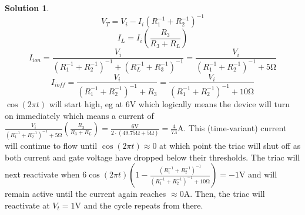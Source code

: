 \documentclass[10pt]{article}
\theoremstyle{definition}
\newtheorem{soln}{Solution}
\begin{document}
\begin{soln} 
  $$V_T=V_i-I_i\left(R_1^{-1}+R_2^{-1}\right)^{-1}$$
  $$I_L=I_i\left(\frac{R_3}{R_3+R_L}\right)$$
  $$I_{ion}=\frac{V_i}{\left(R_1^{-1}+R_2^{-1}\right)^{-1}+\left(R_L^{-1}+R_3^{-1}\right)^{-1}}=\frac{V_i}{\left(R_1^{-1}+R_2^{-1}\right)^{-1}+5\unit{\ohm}}$$
  $$I_{ioff}=\frac{V_i}{\left(R_1^{-1}+R_2^{-1}\right)^{-1}+R_3}=\frac{V_i}{\left(R_1^{-1}+R_2^{-1}\right)^{-1}+10\unit{\ohm}}$$
  $\cos(2\pi t)$ will start high, eg at $6\unit{\volt}$ which logically means the device will turn on immediately
  which means a current of $\frac{V_i}{\left(R_1^{-1}+R_2^{-1}\right)^{-1}+5\unit{\ohm}}\left(\frac{R_3}{R_3+R_L}\right)=\frac{6\unit{\volt}}{2\cdot(49.75\unit{\ohm}+5\unit{\ohm})}=\frac{4}{73}\unit\ampere$.
  This (time-variant) current will continue to flow until $\cos\left(2\pi t\right)\approx 0$ at which point the triac will shut off as both current and gate voltage have dropped below their thresholds.
  The triac will next reactivate when $6\cos\left(2\pi t\right)\left(1-\frac{\left(R_1^{-1}+R_2^{-1}\right)^{-1}}{\left(R_1^{-1}+R_2^{-1}\right)^{-1}+10\unit{\ohm}}\right)=-1\unit{\volt}$
  and will remain active until the current again reaches $\approx0\unit{\ampere}$. Then, the triac will reactivate at $V_t=1\unit{\volt}$ and the cycle repeats from there.

  \begin{center}
\end{center}
\end{soln}
\end{document}
